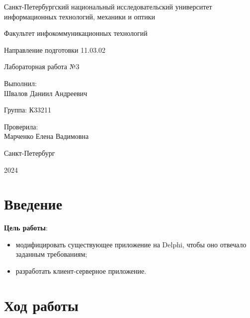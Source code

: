 \documentclass[a4paper, 14pt]{extarticle}
\begin{document}
\begin{titlepage}
  \vspace{0pt plus2fill}
  \noindent

  \vspace{0pt plus6fill}
  \begin{center}
    Санкт-Петербургский национальный исследовательский университет
    информационных технологий, механики и оптики

    \vspace{0pt plus3fill}

    Факультет инфокоммуникационных технологий

    Направление подготовки 11.03.02

    \vspace{0pt plus2fill}

    Лабораторная работа №3
  \end{center}

  \vspace{0pt plus6fill}
  \begin{flushright}
    Выполнил: \\
    Швалов Даниил Андреевич

    Группа: К33211

    Проверила: \\
    Марченко Елена Вадимовна
  \end{flushright}

  \vspace{0pt plus5fill}
  \begin{center}
    Санкт-Петербург

    2024
  \end{center}
\end{titlepage}

\section{Введение}

\textbf{Цель работы}:
\begin{itemize}
  \item модифицировать существующее приложение на
  \foreignlanguage{english}{Delphi}, чтобы оно отвечало заданным требованиям;
  \item разработать клиент-серверное приложение.
\end{itemize}

\section{Ход работы}
\end{document}
